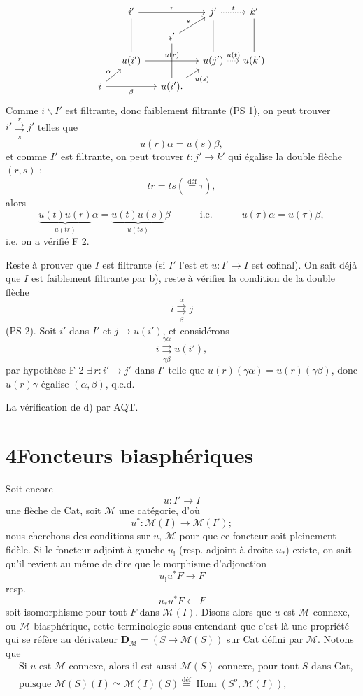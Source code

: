 \documentclass[11pt]{article}
\newcommand{\printedpage}[1]{\marginpar{\footnotesize p.~#1}}
\newcommand{\msp}[1]{\marginpar{\footnotesize [#1]}}
\newcommand{\uHom}{\underline{\operatorname{Hom}}}
\newcommand{\bs}{\backslash}
\newcommand{\cM}{\mathcal{M}}
\newcommand{\dbl}[2]{\mathrel{\overset{#1}{\underset{#2}{\rightrightarrows}}}}
\newcommand{\defeq}{\overset{\text{déf}}{=}}
\begin{document}
\printedpage{31}
\msp{page 48}
\[
\begin{tikzcd}[row sep=small, column sep=small]
& i' \arrow[rr, "r"] \arrow[dd, dash] & & j' \arrow[r, dotted, "t"] \arrow[dd, dash] & k' \arrow[dd, dash] \\
& & i' \arrow[ur, "s"] \arrow[dd, dash] & & \\
& u(i') \arrow[rr, "u(r)"] & & u(j') \arrow[r, dotted, "u(t)"] & u(k') \\
i \arrow[ur, "\alpha"] \arrow[rr, "\beta"'] & & u(i'). \arrow[ur, "u(s)"'] & &
\end{tikzcd}
\]
Comme $i\bs I'$ est filtrante, donc faiblement filtrante (PS 1), on peut trouver $i' \dbl{r}{s} j'$ telles que
\[
u(r)\alpha = u(s)\beta,
\]
et comme $I'$ est filtrante, on peut trouver $t : j' \longrightarrow k'$ qui égalise la double flèche $(r, s)$ :
\[
tr = ts(\defeq \tau),
\]
alors
\[
\underbrace{u(t)u(r)}_{u(tr)}\alpha = \underbrace{u(t)u(s)}_{u(ts)}\beta \qquad\quad \text{i.e.} \qquad\quad u(\tau)\alpha = u(\tau)\beta,
\]
i.e. on a vérifié F 2.

Reste à prouver que $I$ est filtrante (si $I'$ l'est et $u : I' \longrightarrow I$ est cofinal). On sait déjà que $I$ est faiblement filtrante par b), reste à vérifier la condition de la double flèche
\[
i \dbl{\alpha}{\beta} j
\]
(PS 2). Soit $i'$ dans $I'$ et $j \longrightarrow u(i')$, et considérons
\[
i \dbl{\gamma\alpha}{\gamma\beta} u(i'),
\]
par hypothèse F 2 $\exists\, r : i' \longrightarrow j'$ dans $I'$ telle que
\msp{page 49}
$u(r)(\gamma\alpha) = u(r)(\gamma\beta)$, donc $u(r)\gamma$ égalise $(\alpha, \beta)$, q.e.d.

La vérification de d) par AQT.

\printedpage{32}
\section*{4\quad Foncteurs biasphériques}

Soit encore
\[
u : I' \longrightarrow I
\]
une flèche de Cat, soit $\cM$ une catégorie, d'où
\[
u^* : \cM(I) \longrightarrow \cM(I');
\tag*{(4.1)}
\]
nous cherchons des conditions sur $u$, $\cM$ pour que ce foncteur soit pleinement fidèle. Si le foncteur adjoint à gauche $u_!$ (resp. adjoint à droite $u_*$) existe, on sait qu'il revient au même de dire que le morphisme d'adjonction
\[
u_!u^*F \longrightarrow F
\tag*{(4.2)}
\]
resp.
\[
u_*u^*F \longleftarrow F
\tag*{(4.2 bis)}
\]
soit isomorphisme pour tout $F$ dans $\cM(I)$. Disons alors que $u$ est $\cM$-connexe, ou $\cM$-biasphérique, cette terminologie sous-entendant que c'est là une propriété qui se réfère au dérivateur $\mathbf{D}_{\cM} = (S \longmapsto \cM(S))$ sur Cat défini par $\cM$. Notons que
\[
\begin{aligned}
&\text{Si $u$ est $\cM$-connexe, alors il est aussi $\cM(S)$-connexe, pour tout $S$ dans Cat,}\\
&\text{puisque $\cM(S)(I) \simeq \cM(I)(S) \defeq \uHom(S^o, \cM(I))$,}
\end{aligned}
\tag*{(4.3)}
\]
\end{document}
